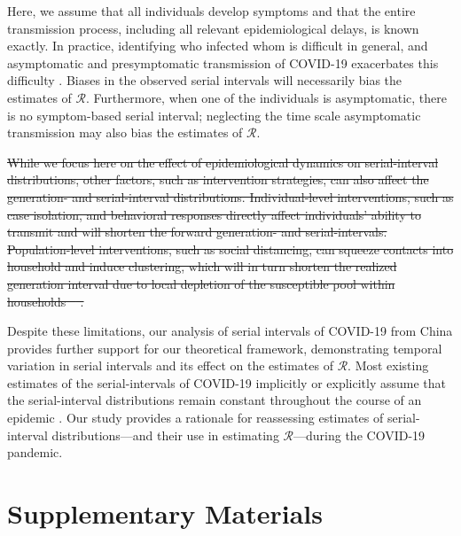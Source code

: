 \documentclass[12pt]{article}
\newcommand{\RR}{\ensuremath{{\mathcal R}}\xspace}
\providecommand{\DIFdeltex}[1]{{\protect\color{red}\sout{#1}}}                      %
\providecommand{\DIFaddend}{} %
\providecommand{\DIFdelbegin}{} %
\providecommand{\DIFdelend}{} %
\providecommand{\DIFdel}[1]{\texorpdfstring{\DIFdeltex{#1}}{}} %
\newcommand{\DIFscaledelfig}{0.5}
\newlength{\DIFdelgraphicswidth} %
\newlength{\DIFdelgraphicsheight} %
\newcommand{\DIFdelincludegraphics}[2][]{%
\sbox{\DIFdelgraphicsbox}{\DIFOincludegraphics[#1]{#2}}%
\settoboxwidth{\DIFdelgraphicswidth}{\DIFdelgraphicsbox} %
\settoboxtotalheight{\DIFdelgraphicsheight}{\DIFdelgraphicsbox} %
\scalebox{\DIFscaledelfig}{%
\parbox[b]{\DIFdelgraphicswidth}{\usebox{\DIFdelgraphicsbox}\\[-\baselineskip] \rule{\DIFdelgraphicswidth}{0em}}\llap{\resizebox{\DIFdelgraphicswidth}{\DIFdelgraphicsheight}{%
\setlength{\unitlength}{\DIFdelgraphicswidth}%
\begin{picture}(1,1)%
\thicklines\linethickness{2pt} %
{\color[rgb]{1,0,0}\put(0,0){\framebox(1,1){}}}%
{\color[rgb]{1,0,0}\put(0,0){\line( 1,1){1}}}%
{\color[rgb]{1,0,0}\put(0,1){\line(1,-1){1}}}%
\end{picture}%
}\hspace*{3pt}}} %
} %
\DeclareRobustCommand{\DIFaddend}{\DIFOaddend \let\includegraphics\DIFOincludegraphics} %
\DeclareRobustCommand{\DIFdelbegin}{\DIFOdelbegin \let\includegraphics\DIFdelincludegraphics} %
\DeclareRobustCommand{\DIFdelend}{\DIFOaddend \let\includegraphics\DIFOincludegraphics} %
\begin{document}
\DIFaddend Here, we assume that all individuals develop symptoms and that the entire transmission process, including all relevant epidemiological delays, is known exactly.
In practice, identifying who infected whom is difficult in general, and asymptomatic and presymptomatic transmission of COVID-19 exacerbates this difficulty \citep{bai2020presumed,he2020temporal,wei2020presymptomatic}.
Biases in the observed serial intervals will necessarily bias the estimates of \RR. 
Furthermore, when one of the individuals is asymptomatic, there is no symptom-based serial interval; 
neglecting the time scale asymptomatic transmission may also bias the estimates of \RR \citep{park2020time}.

\DIFdelbegin \DIFdel{While we focus here on the effect of epidemiological dynamics on serial-interval distributions, other factors, such as intervention strategies, can also affect the generation- and serial-interval distributions.
Individual-level interventions, such as case isolation, and behavioral responses directly affect individuals' ability to transmit and will shorten the forward generation- and serial-intervals.
Population-level interventions, such as social distancing, can squeeze contacts into household and induce clustering, which will in turn shorten the realized generation interval due to local depletion of the susceptible pool within households \mbox{%
\citep{park2019inferring}}\hspace{0pt}%
.
}%

\DIFdelend Despite these limitations, our analysis of serial intervals of COVID-19 from China provides further support for our theoretical framework, demonstrating temporal variation in serial intervals and its effect on the estimates of \RR.
Most existing estimates of the serial-intervals of COVID-19 implicitly or explicitly assume that the serial-interval distributions remain constant throughout the course of an epidemic \citep{du2020serial, he2020temporal, nishiura2020serial,tindale2020transmission,zhao2020estimating,zhang2020evolving}.
Our study provides a rationale for reassessing estimates of
serial-interval distributions---and their use in estimating
\RR---during the COVID-19 pandemic.

\pagebreak

\section{Supplementary Materials}
\end{document}
